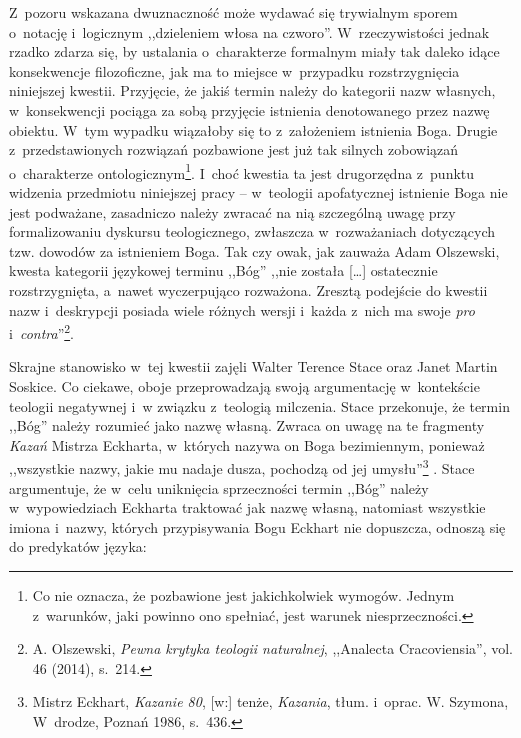 Z~pozoru wskazana dwuznaczność może wydawać się trywialnym sporem o~notację i~logicznym ,,dzieleniem włosa na czworo''. W~rzeczywistości jednak rzadko zdarza się, by ustalania o~charakterze formalnym miały tak daleko idące konsekwencje filozoficzne, jak ma to miejsce w~przypadku rozstrzygnięcia niniejszej kwestii. Przyjęcie, że jakiś termin należy do kategorii nazw własnych, w~konsekwencji pociąga za sobą przyjęcie istnienia denotowanego przez nazwę obiektu. W~tym wypadku wiązałoby się to z~założeniem istnienia Boga. Drugie z~przedstawionych rozwiązań pozbawione jest już tak silnych zobowiązań o~charakterze ontologicznym\footnote{Co nie oznacza, że pozbawione jest jakichkolwiek wymogów. Jednym z~warunków, jaki powinno ono spełniać, jest warunek niesprzeczności.}. I~choć kwestia ta jest drugorzędna z~punktu widzenia przedmiotu niniejszej pracy -- w~teologii apofatycznej istnienie Boga nie jest podważane, zasadniczo należy zwracać na nią szczególną uwagę przy formalizowaniu dyskursu teologicznego, zwłaszcza w~rozważaniach dotyczących tzw. dowodów za istnieniem Boga. Tak czy owak, jak zauważa Adam Olszewski, kwesta kategorii językowej terminu ,,Bóg'' ,,nie została [\ldots] ostatecznie rozstrzygnięta, a~nawet wyczerpująco rozważona. Zresztą podejście do kwestii nazw i~deskrypcji posiada wiele różnych wersji i~każda z~nich ma swoje \textit{pro} i~\textit{contra}''\footnote{A. Olszewski, \textit{Pewna krytyka teologii naturalnej}, ,,Analecta Cracoviensia'', vol. 46 (2014), s.~214.}.

Skrajne stanowisko w~tej kwestii zajęli Walter Terence Stace oraz Janet Martin Soskice. Co ciekawe, oboje przeprowadzają swoją argumentację w~kontekście teologii negatywnej i~w związku z~teologią milczenia. Stace przekonuje, że termin ,,Bóg'' należy rozumieć jako nazwę własną. Zwraca on uwagę na te fragmenty \textit{Kazań} Mistrza Eckharta, w~których nazywa on Boga bezimiennym, ponieważ ,,wszystkie nazwy, jakie mu nadaje dusza, pochodzą od jej umysłu''\footnote{Mistrz Eckhart, \textit{Kazanie 80}, [w:] tenże, \textit{Kazania}, tłum. i~oprac. W. Szymona, W~drodze, Poznań 1986, s.~436.} . Stace argumentuje, że w~celu uniknięcia sprzeczności termin ,,Bóg'' należy w~wypowiedziach Eckharta traktować jak nazwę własną, natomiast wszystkie imiona i~nazwy, których przypisywania Bogu Eckhart nie dopuszcza, odnoszą się do predykatów języka:

